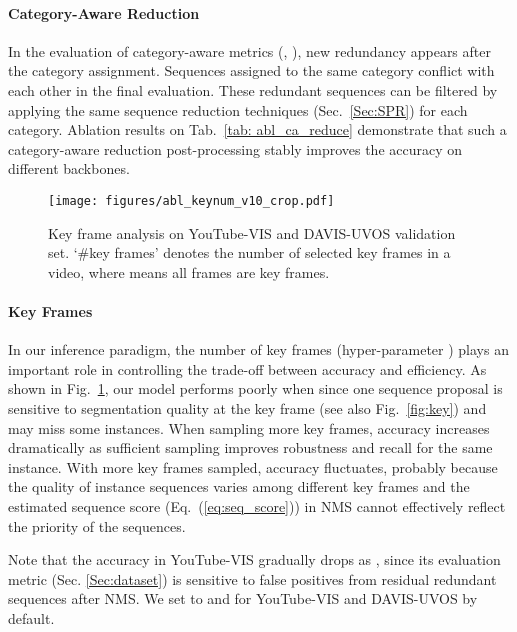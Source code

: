 \documentclass[10pt,twocolumn,letterpaper]{article}
\begin{document}
	\vspace{-0.15in}
	\paragraph{Category-Aware Reduction}
	In the evaluation of category-aware metrics (\eg, ), new redundancy appears after the category assignment. Sequences assigned to the same category conflict with each other in the final evaluation.
	These redundant sequences can be filtered by applying the same sequence reduction techniques (Sec.~\ref{Sec:SPR}) for each category.
	Ablation results on Tab.~\ref{tab: abl_ca_reduce} demonstrate that such a category-aware reduction post-processing stably improves the accuracy on different backbones.

	
	\begin{figure}[t]
		\begin{center}
			\texttt{[image: figures/abl\_keynum\_v10\_crop.pdf]}
		\end{center}
		\vspace{-0.15in}
		\caption{Key frame analysis on YouTube-VIS and DAVIS-UVOS validation set. `\#key frames' denotes the number of selected key frames in a video, where  means all frames are key frames. }
		\label{fig:abl_keynum}
		\vspace{-0.15in}
	\end{figure}
	
	\vspace{-0.2in}
	\paragraph{Key Frames} \label{sec:abl_keyframe}
	In our inference paradigm, the number of key frames (hyper-parameter ) plays an important role in controlling the trade-off between accuracy and efficiency. 
	As shown in Fig.~\ref{fig:abl_keynum}, our model performs poorly when  since one sequence proposal is sensitive to segmentation quality at the key frame (see also Fig.~\ref{fig:key}) and may miss some instances.
	When sampling more key frames, accuracy increases dramatically as sufficient sampling improves robustness and recall for the same instance. 
	With more key frames sampled, accuracy fluctuates, probably because the quality of instance sequences varies among different key frames and the estimated sequence score (Eq.~(\ref{eq:seq_score})) in NMS cannot effectively reflect the priority of the sequences.
	
	Note that the accuracy in YouTube-VIS gradually drops as , since its evaluation metric (Sec. \ref{Sec:dataset}) is sensitive to false positives from residual redundant sequences after NMS.
	We set  to  and  for YouTube-VIS and DAVIS-UVOS by default.
	
\end{document}
